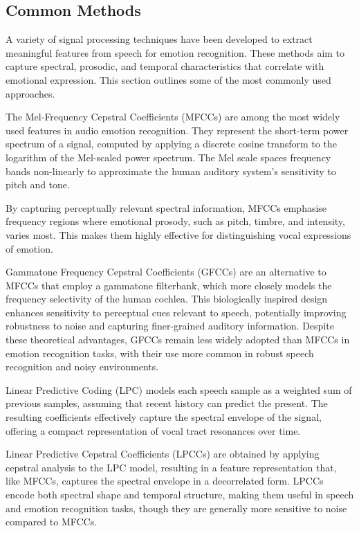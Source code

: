 \subsection{Common Methods}

A variety of signal processing techniques have been developed to extract meaningful features from speech for emotion recognition. These methods aim to capture spectral, prosodic, and temporal characteristics that correlate with emotional expression. This section outlines some of the most commonly used approaches.

The Mel-Frequency Cepstral Coefficients (MFCCs) \cite{Ali2021-ie} are among the most widely used features in audio emotion recognition. They represent the short-term power spectrum of a signal, computed by applying a discrete cosine transform to the logarithm of the Mel-scaled power spectrum. The Mel scale spaces frequency bands non-linearly to approximate the human auditory system's sensitivity to pitch and tone.

By capturing perceptually relevant spectral information, MFCCs emphasise frequency regions where emotional prosody, such as pitch, timbre, and intensity, varies most. This makes them highly effective for distinguishing vocal expressions of emotion.

Gammatone Frequency Cepstral Coefficients (GFCCs) \cite{Shi2016-th} are an alternative to MFCCs that employ a gammatone filterbank, which more closely models the frequency selectivity of the human cochlea. This biologically inspired design enhances sensitivity to perceptual cues relevant to speech, potentially improving robustness to noise and capturing finer-grained auditory information. Despite these theoretical advantages, GFCCs remain less widely adopted than MFCCs in emotion recognition tasks, with their use more common in robust speech recognition and noisy environments.

Linear Predictive Coding (LPC) \cite{OShaughnessy1988-ws} models each speech sample as a weighted sum of previous samples, assuming that recent history can predict the present. The resulting coefficients effectively capture the spectral envelope of the signal, offering a compact representation of vocal tract resonances over time.

Linear Predictive Cepstral Coefficients (LPCCs) \cite{6895780} are obtained by applying cepstral analysis to the LPC model, resulting in a feature representation that, like MFCCs, captures the spectral envelope in a decorrelated form. LPCCs encode both spectral shape and temporal structure, making them useful in speech and emotion recognition tasks, though they are generally more sensitive to noise compared to MFCCs.

